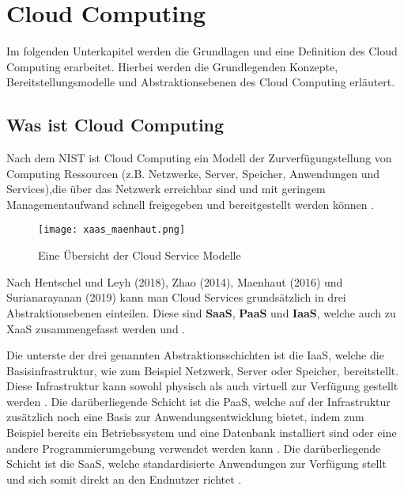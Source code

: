 \section{Cloud Computing}

Im folgenden Unterkapitel werden die Grundlagen und eine Definition des Cloud Computing erarbeitet. Hierbei werden die Grundlegenden Konzepte,
Bereitstellungsmodelle und Abstraktionsebenen des Cloud Computing erläutert.

\subsection{Was ist Cloud Computing}

Nach dem \ac{NIST} ist Cloud Computing ein Modell der Zurverfügungstellung von Computing Ressourcen
(z.B. Netzwerke, Server, Speicher, Anwendungen und Services),die über das Netzwerk erreichbar sind und mit geringem Managementaufwand
schnell freigegeben und bereitgestellt werden können \cite[Vgl.][S. 2]{Mell2011}.

\begin{wrapfigure}{r}{0.45\textwidth}
\centering
\texttt{[image: xaas\_maenhaut.png]}
\caption{Eine Übersicht der Cloud Service Modelle \cite[S. 33]{Maenhaut2016}}
\label{fig:XaaS}
\end{wrapfigure}

Nach Hentschel und Leyh (2018), Zhao (2014), Maenhaut (2016) und Surianarayanan (2019) kann man Cloud Services grundsätzlich in drei Abstraktionsebenen einteilen. Diese sind \textbf{\ac{SaaS}},
\textbf{\ac{PaaS}} und \textbf{\ac{IaaS}}, welche auch zu \ac{XaaS} zusammengefasst werden
\cite[Vgl.][S. 9]{Reinheimer2018}\cite[Vgl.][S. 143f]{Zhao2014}\cite[Vgl.][S. 32ff]{Maenhaut2016} und \cite[Vgl.][S. 226ff]{Surianarayanan2019}.

Die unterste der drei genannten Abstraktionsschichten ist die \ac{IaaS}, welche die Basisinfrastruktur, wie zum Beispiel Netzwerk, Server oder Speicher,
bereitstellt. Diese Infrastruktur kann sowohl physisch als auch virtuell zur Verfügung gestellt werden \cite[Vgl.][S. 9f]{Reinheimer2018}.
Die darüberliegende Schicht ist die \ac{PaaS}, welche auf der Infrastruktur zusätzlich noch eine Basis zur Anwendungsentwicklung bietet, indem zum Beispiel
bereits ein Betriebssystem und eine Datenbank installiert sind oder eine andere Programmierumgebung verwendet werden kann \cite[Vgl.][S. 10]{Reinheimer2018}.
Die darüberliegende Schicht ist die \ac{SaaS}, welche standardisierte Anwendungen zur Verfügung stellt und sich somit direkt an den Endnutzer richtet
\cite[Vgl.][S. 11]{Reinheimer2018}.

